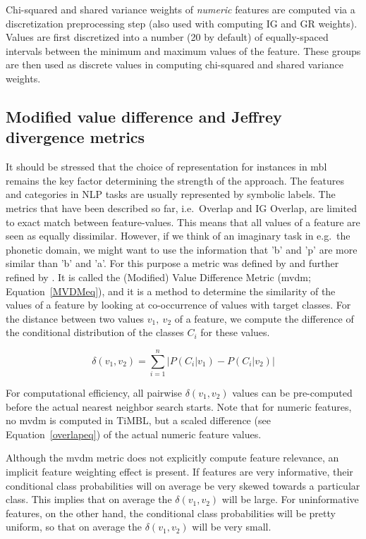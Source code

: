 \documentclass{report}
\begin{document}
Chi-squared and shared variance weights of {\em numeric}\/ features are
computed via a discretization preprocessing step (also used with
computing IG and GR weights). Values are first discretized into a
number (20 by default) of equally-spaced intervals between the
minimum and maximum values of the feature. These groups are then used
as discrete values in computing chi-squared and shared variance weights.

\subsection{Modified value difference and Jeffrey divergence metrics}
\label{mvdm}

It should be stressed that the choice of representation for instances
in {\sc mbl} remains the key factor determining the strength of the
approach. The features and categories in NLP tasks are usually
represented by symbolic labels. The metrics that have been described
so far, i.e.~Overlap and IG Overlap, are limited to exact match
between feature-values. This means that all values of a feature are
seen as equally dissimilar. However, if we think of an imaginary task
in e.g.~the phonetic domain, we might want to use the information that
'b' and 'p' are more similar than 'b' and 'a'. For this purpose a
metric was defined by  and further refined by
. It is called the (Modified) Value Difference
Metric ({\sc mvdm}; Equation~\ref{MVDMeq}), and it is a method to
determine the similarity of the values of a feature by looking at
co-occurrence of values with target classes. For the distance between
two values $v_{1},\ v_{2}$ of a feature, we compute the difference of
the conditional distribution of the classes $C_{i}$ for these values.

\begin{equation}
\delta(v_{1}, v_{2}) = \sum_{i=1}^{n} \left| P(C_{i}|v_{1}) - P(C_{i}|v_{2})
\right|
\label{MVDMeq}
\end{equation}

For computational efficiency, all pairwise $\delta(v_{1}, v_{2})$
values can be pre-comput\-ed before the actual nearest neighbor search
starts. Note that for numeric features, no {\sc mvdm} is computed in
TiMBL, but a scaled difference (see Equation~\ref{overlapeq}) of the
actual numeric feature values.

Although the {\sc mvdm} metric does not explicitly compute feature
relevance, an implicit feature weighting effect is present. If
features are very informative, their conditional class probabilities
will on average be very skewed towards a particular class. This
implies that on average the $\delta(v_{1}, v_{2})$ will be large. For
uninformative features, on the other hand, the conditional class
probabilities will be pretty uniform, so that on average the
$\delta(v_{1}, v_{2})$ will be very small.
\end{document}
